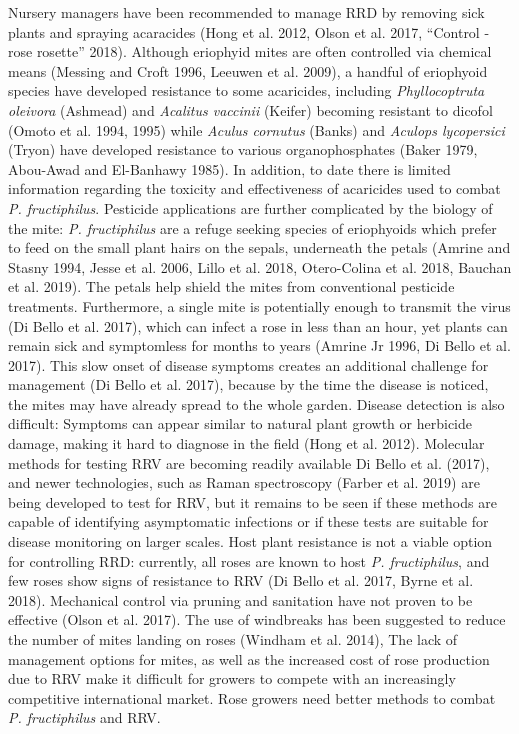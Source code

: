\documentclass[12pt,final,CPage]{ufthesis}
\begin{document}
{  Nursery managers have been recommended to manage RRD by removing sick plants and spraying acaracides (Hong et al. 2012, Olson et al. 2017, {``Control - rose rosette''} 2018). Although eriophyid mites are often controlled via chemical means (Messing and Croft 1996, Leeuwen et al. 2009), a handful of eriophyoid species have developed resistance to some acaricides, including \emph{Phyllocoptruta oleivora} (Ashmead) and \emph{Acalitus vaccinii} (Keifer) becoming resistant to dicofol (Omoto et al. 1994, 1995) while \emph{Aculus cornutus} (Banks) and \emph{Aculops lycopersici} (Tryon) have developed resistance to various organophosphates (Baker 1979, Abou-Awad and El-Banhawy 1985). In addition, to date there is limited information regarding the toxicity and effectiveness of acaricides used to combat \emph{P. fructiphilus}. Pesticide applications are further complicated by the biology of the mite: \emph{P. fructiphilus} are a refuge seeking species of eriophyoids which prefer to feed on the small plant hairs on the sepals, underneath the petals (Amrine and Stasny 1994, Jesse et al. 2006, Lillo et al. 2018, Otero-Colina et al. 2018, Bauchan et al. 2019). The petals help shield the mites from conventional pesticide treatments. Furthermore, a single mite is potentially enough to transmit the virus (Di Bello et al. 2017), which can infect a rose in less than an hour, yet plants can remain sick and symptomless for months to years (Amrine Jr 1996, Di Bello et al. 2017). This slow onset of disease symptoms creates an additional challenge for management (Di Bello et al. 2017), because by the time the disease is noticed, the mites may have already spread to the whole garden. Disease detection is also difficult: Symptoms can appear similar to natural plant growth or herbicide damage, making it hard to diagnose in the field (Hong et al. 2012). Molecular methods for testing RRV are becoming readily available Di Bello et al. (2017), and newer technologies, such as Raman spectroscopy (Farber et al. 2019) are being developed to test for RRV, but it remains to be seen if these methods are capable of identifying asymptomatic infections or if these tests are suitable for disease monitoring on larger scales. Host plant resistance is not a viable option for controlling RRD: currently, all roses are known to host \emph{P. fructiphilus}, and few roses show signs of resistance to RRV (Di Bello et al. 2017, Byrne et al. 2018). Mechanical control via pruning and sanitation have not proven to be effective (Olson et al. 2017). The use of windbreaks has been suggested to reduce the number of mites landing on roses (Windham et al. 2014), The lack of management options for mites, as well as the increased cost of rose production due to RRV make it difficult for growers to compete with an increasingly competitive international market. Rose growers need better methods to combat \emph{P. fructiphilus} and RRV.
  \begin{figure}


\end{figure}}
\end{document}
